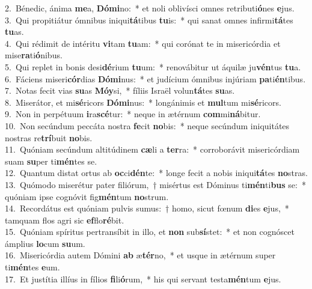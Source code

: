 {2.~}Bénedic, ánima \textbf{me}a, \textbf{Dó}\textbf{mi}no:~* et noli oblivísci omnes retributi\textbf{ó}nes \textbf{e}jus.\\
{3.~}Qui propitiátur ómnibus iniqui\textbf{tá}tibus \textbf{tu}is:~* qui sanat omnes infirmi\textbf{tá}tes \textbf{tu}as.\\
{4.~}Qui rédimit de intéritu \textbf{vi}tam \textbf{tu}am:~* qui corónat te in misericórdia et mise\textbf{ra}ti\textbf{ó}nibus.\\
{5.~}Qui replet in bonis desi\textbf{dé}rium \textbf{tu}um:~* renovábitur ut áquilæ ju\textbf{vén}tus \textbf{tu}a.\\
{6.~}Fáciens miseri\textbf{cór}dias \textbf{Dó}\textbf{mi}nus:~* et judícium ómnibus injúriam \textbf{pa}ti\textbf{én}tibus.\\
{7.~}Notas fecit vias \textbf{su}as \textbf{Mó}\textbf{y}si,~* fíliis Israël volun\textbf{tá}tes \textbf{su}as.\\
{8.~}Miserátor, et mi\textbf{sé}ricors \textbf{Dó}\textbf{mi}nus:~* longánimis et \textbf{mul}tum mi\textbf{sé}ricors.\\
{9.~}Non in perpétuum \textbf{i}ra\textbf{scé}tur:~* neque in ætérnum \textbf{com}mi\textbf{ná}bitur.\\
{10.~}Non secúndum peccáta nostra \textbf{fe}cit \textbf{no}bis:~* neque secúndum iniquitátes nostras re\textbf{trí}buit \textbf{no}bis.\\
{11.~}Quóniam secúndum altitúdinem \textbf{cæ}li a \textbf{ter}ra:~* corroborávit misericórdiam suam \textbf{su}per ti\textbf{mén}tes se.\\
{12.~}Quantum distat ortus ab \textbf{oc}ci\textbf{dén}te:~* longe fecit a nobis iniqui\textbf{tá}tes \textbf{no}stras.\\
{13.~}Quómodo miserétur pater filiórum,~† misértus est Dóminus ti\textbf{mén}ti\textbf{bus} se:~* quóniam ipse cognóvit fig\textbf{mén}tum \textbf{no}strum.\\
{14.~}Recordátus est quóniam pulvis sumus:~† homo, sicut fœnum \textbf{di}es \textbf{e}jus,~* tamquam flos agri sic \textbf{ef}flo\textbf{ré}bit.\\
{15.~}Quóniam spíritus pertransíbit in illo, et \textbf{non} sub\textbf{sí}stet:~* et non cognóscet ámplius \textbf{lo}cum \textbf{su}um.\\
{16.~}Misericórdia autem Dómini \textbf{ab} æ\textbf{tér}no,~* et usque in ætérnum super ti\textbf{mén}tes \textbf{e}um.\\
{17.~}Et justítia illíus in fílios \textbf{fi}li\textbf{ó}rum,~* his qui servant testa\textbf{mén}tum \textbf{e}jus.\\
